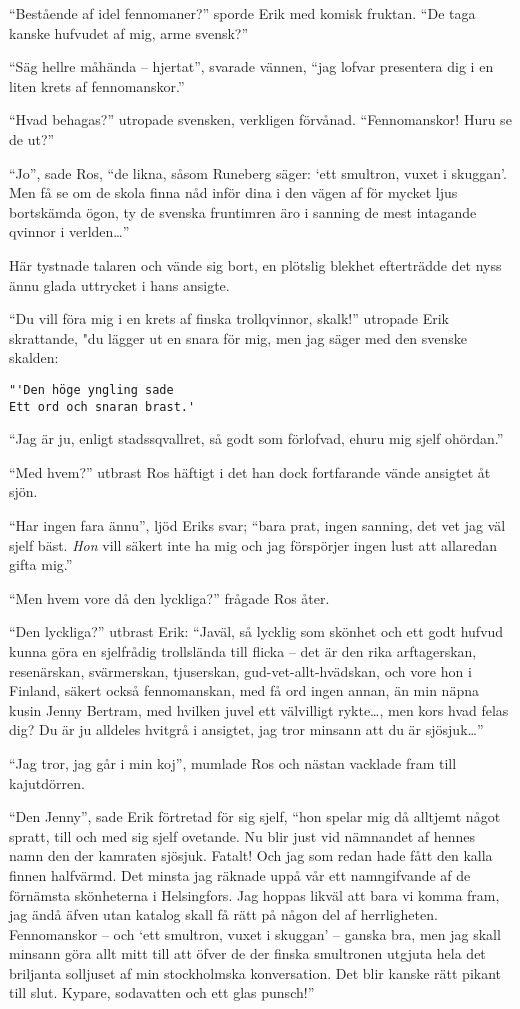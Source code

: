 ``Bestående af idel fennomaner?'' sporde Erik med komisk fruktan. ``De
taga kanske hufvudet af mig, arme svensk?''

``Säg hellre måhända -- hjertat'', svarade vännen, ``jag lofvar
presentera dig i en liten krets af fennomanskor.''

``Hvad behagas?'' utropade svensken, verkligen förvånad. ``Fennomanskor!
Huru se de ut?''

``Jo'', sade Ros, ``de likna, såsom Runeberg säger: `ett smultron, vuxet
i skuggan'. Men få se om de skola finna nåd inför dina i den vägen af
för mycket ljus bortskämda ögon, ty de svenska fruntimren äro i sanning
de mest intagande qvinnor i verlden\ldots{}''

Här tystnade talaren och vände sig bort, en plötslig blekhet efterträdde
det nyss ännu glada uttrycket i hans ansigte.

``Du vill föra mig i en krets af finska trollqvinnor, skalk!'' utropade
Erik skrattande, "du lägger ut en snara för mig, men jag säger med den
svenske skalden:

\begin{verbatim}
"'Den höge yngling sade
Ett ord och snaran brast.'
\end{verbatim}

``Jag är ju, enligt stadssqvallret, så godt som förlofvad, ehuru mig
sjelf ohördan.''

``Med hvem?'' utbrast Ros häftigt i det han dock fortfarande vände
ansigtet åt sjön.

``Har ingen fara ännu'', ljöd Eriks svar; ``bara prat, ingen sanning,
det vet jag väl sjelf bäst. \emph{Hon} vill säkert inte ha mig och jag
förspörjer ingen lust att allaredan gifta mig.''

``Men hvem vore då den lyckliga?'' frågade Ros åter.

``Den lyckliga?'' utbrast Erik: ``Javäl, så lycklig som skönhet och ett
godt hufvud kunna göra en sjelfrådig trollslända till flicka -- det är
den rika arftagerskan, resenärskan, svärmerskan, tjuserskan,
gud-vet-allt-hvädskan, och vore hon i Finland, säkert också
fennomanskan, med få ord ingen annan, än min näpna kusin Jenny Bertram,
med hvilken juvel ett välvilligt rykte\ldots, men kors hvad felas dig?
Du är ju alldeles hvitgrå i ansigtet, jag tror minsann att du är
sjösjuk\ldots{}''

``Jag tror, jag går i min koj'', mumlade Ros och nästan vacklade fram
till kajutdörren.

``Den Jenny'', sade Erik förtretad för sig sjelf, ``hon spelar mig då
alltjemt något spratt, till och med sig sjelf ovetande. Nu blir just vid
nämnandet af hennes namn den der kamraten sjösjuk. Fatalt! Och jag som
redan hade fått den kalla finnen halfvärmd. Det minsta jag räknade uppå
vår ett namngifvande af de förnämsta skönheterna i Helsingfors. Jag
hoppas likväl att bara vi komma fram, jag ändå äfven utan katalog skall
få rätt på någon del af herrligheten. Fennomanskor -- och `ett smultron,
vuxet i skuggan' -- ganska bra, men jag skall minsann göra allt mitt
till att öfver de der finska smultronen utgjuta hela det briljanta
solljuset af min stockholmska konversation. Det blir kanske rätt pikant
till slut. Kypare, sodavatten och ett glas punsch!''


